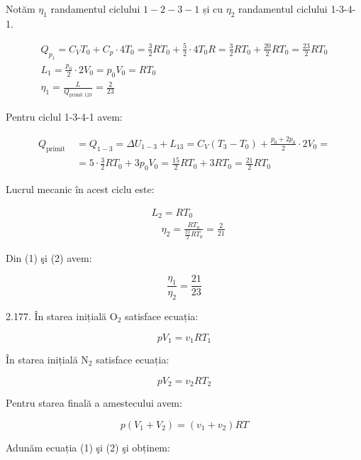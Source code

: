 \documentclass[10pt]{article}
\begin{document}
Notăm $\eta_{1}$ randamentul ciclului $1-2-3-1$ și cu $\eta_{2}$ randamentul ciclului 1-3-4-1.


\begin{gather*}
Q_{p_{1}}=C_{V} T_{0}+C_{p} \cdot 4 T_{0}=\frac{3}{2} R T_{0}+\frac{5}{2} \cdot 4 T_{0} R=\frac{3}{2} R T_{0}+\frac{20}{2} R T_{0}=\frac{23}{2} R T_{0} \\
L_{1}=\frac{p_{0}}{2} \cdot 2 V_{0}=p_{0} V_{0}=R T_{0} \\
\eta_{1}=\frac{L}{Q_{\text {primit } 123}}=\frac{2}{23} \tag{1}
\end{gather*}


Pentru ciclul 1-3-4-1 avem:

$$
\begin{aligned}
Q_{\text {primit }} & =Q_{1-3}=\Delta U_{1-3}+L_{13}=C_{V}\left(T_{3}-T_{0}\right)+\frac{p_{0}+2 p_{0}}{2} \cdot 2 V_{0}= \\
& =5 \cdot \frac{3}{2} R T_{0}+3 p_{0} V_{0}=\frac{15}{2} R T_{0}+3 R T_{0}=\frac{21}{2} R T_{0}
\end{aligned}
$$

Lucrul mecanic în acest ciclu este:


\begin{align*}
& L_{2}=R T_{0} \\
& \quad \eta_{2}=\frac{R T_{0}}{\frac{21}{2} R T_{0}}=\frac{2}{21} \tag{2}
\end{align*}


Din (1) şi (2) avem:

$$
\frac{\eta_{1}}{\eta_{2}}=\frac{21}{23}
$$

2.177. În starea inițială $\mathrm{O}_{2}$ satisface ecuația:


\begin{equation*}
p V_{1}=v_{1} R T_{1} \tag{1}
\end{equation*}


În starea inițială $\mathrm{N}_{2}$ satisface ecuația:


\begin{equation*}
p V_{2}=v_{2} R T_{2} \tag{2}
\end{equation*}


Pentru starea finală a amestecului avem:


\begin{equation*}
p\left(V_{1}+V_{2}\right)=\left(v_{1}+v_{2}\right) R T \tag{3}
\end{equation*}


Adunăm ecuația (1) şi (2) şi obținem:
\end{document}
